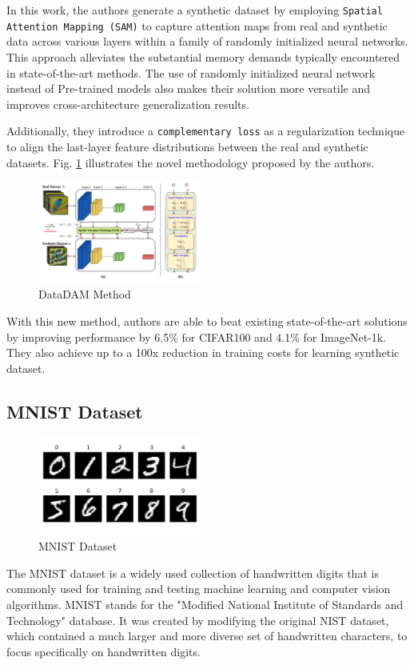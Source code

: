 \documentclass[conference, compsoc]{IEEEtran}
\begin{document}
	In this work, the authors generate a synthetic dataset by employing \texttt{Spatial Attention Mapping (SAM)} to capture attention maps from real and synthetic data across various layers within a family of randomly initialized neural networks. This approach alleviates the substantial memory demands typically encountered in state-of-the-art methods. The use of randomly initialized neural network instead of Pre-trained models also makes their solution more versatile and improves cross-architecture generalization results. 
	
	Additionally, they introduce a \texttt{complementary loss} as a regularization technique to align the last-layer feature distributions between the real and synthetic datasets. Fig. \ref{fig:datadam_method} illustrates the novel methodology proposed by the authors.
	
	
	
	\begin{figure}[H]
		\centering
		\includegraphics[width=0.48\textwidth]{datadam.png}
		\caption{DataDAM Method \cite{sajedi2023datadamefficientdatasetdistillation}}
		\label{fig:datadam_method}
	\end{figure}
	
	With this new method, authors are able to beat existing state-of-the-art solutions by improving performance by 6.5\% for CIFAR100 and 4.1\% for ImageNet-1k. They also achieve up to a 100x reduction in training costs for learning synthetic dataset.
	
	\subsection{MNIST Dataset}
	\begin{figure}[H]
		\centering
		\includegraphics[width=0.48\textwidth]{MNIST_dataset.png}
		\caption{MNIST Dataset \cite{deng2012mnist}}
		\label{fig:mnist_dataset}
	\end{figure}
	The MNIST dataset is a widely used collection of handwritten digits that is commonly used for training and testing machine learning and computer vision algorithms. MNIST stands for the "Modified National Institute of Standards and Technology" database. It was created by modifying the original NIST dataset, which contained a much larger and more diverse set of handwritten characters, to focus specifically on handwritten digits.
	
\end{document}
